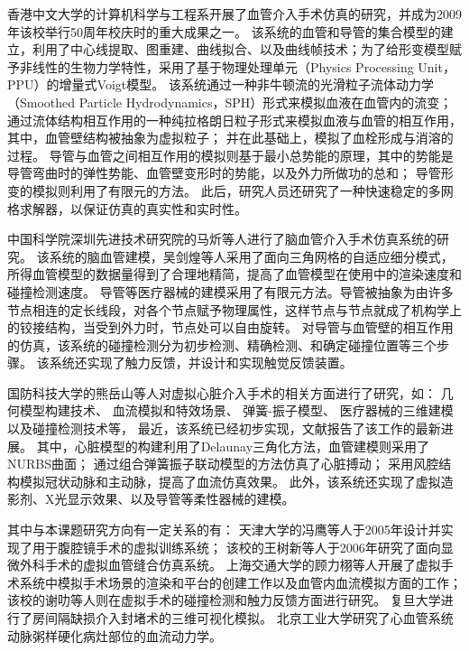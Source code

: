 香港中文大学的计算机科学与工程系开展了血管介入手术仿真的研究\cite{guo2007CUHK}\cite{Chui2010CUHK}\cite{Li2011CUHK}\cite{Li2012CUHK}，并成为2009年该校举行50周年校庆时的重大成果之一\cite{cuhkweb}。
该系统的血管和导管的集合模型的建立，利用了中心线提取、图重建、曲线拟合、以及曲线帧技术；为了给形变模型赋予非线性的生物力学特性，采用了基于物理处理单元（Physics Processing Unit，PPU）的增量式Voigt模型\cite{guo2007CUHK}。
该系统通过一种非牛顿流的光滑粒子流体动力学（Smoothed Particle Hydrodynamics，SPH）形式来模拟血液在血管内的流变；
通过流体结构相互作用的一种纯拉格朗日粒子形式来模拟血液与血管的相互作用，其中，血管壁结构被抽象为虚拟粒子；
并在此基础上，模拟了血栓形成与消溶的过程\cite{Chui2010CUHK}。
导管与血管之间相互作用的模拟则基于最小总势能的原理，其中的势能是导管弯曲时的弹性势能、血管壁变形时的势能，以及外力所做功的总和；
导管形变的模拟则利用了有限元的方法\cite{Li2011CUHK}。
此后，研究人员还研究了一种快速稳定的多网格求解器，以保证仿真的真实性和实时性\cite{Li2012CUHK}。

中国科学院深圳先进技术研究院的马炘等人\cite{Ma2010SIAT}\cite{Ma2010aSIAT}进行了脑血管介入手术仿真系统的研究。
该系统的脑血管建模，吴剑煌等人采用了面向三角网格的自适应细分模式\cite{Ma2010bSIAT}\cite{Wu2006SIAT}，所得血管模型的数据量得到了合理地精简，提高了血管模型在使用中的渲染速度和碰撞检测速度。
导管等医疗器械的建模采用了有限元方法。导管被抽象为由许多节点相连的定长线段，对各个节点赋予物理属性，这样节点与节点就成了机构学上的铰接结构，当受到外力时，节点处可以自由旋转\cite{Ma2010SIAT}。
对导管与血管壁的相互作用的仿真，该系统的碰撞检测分为初步检测、精确检测、和确定碰撞位置等三个步骤\cite{Ma2010SIAT}。
该系统还实现了触力反馈，并设计和实现触觉反馈装置\cite{Ma2010SIAT}。

国防科技大学的熊岳山等人对虚拟心脏介入手术的相关方面进行了研究，如：
几何模型构建技术\cite{han2005master}、
血流模拟和特效场景\cite{ren2005master}\cite{Ren2006NUDT}、
弹簧-振子模型\cite{wang2006master}\cite{Wang2008NUDT}、
医疗器械的三维建模\cite{zhu2007master}
以及碰撞检测技术\cite{kang2007master}等，
最近，该系统已经初步实现，文献\cite{Tan2012NUDT}报告了该工作的最新进展。
其中，心脏模型的构建利用了Delaunay三角化方法，血管建模则采用了NURBS曲面；
通过组合弹簧振子联动模型的方法仿真了心脏搏动\cite{Wang2008NUDT}；
采用风腔结构\cite{Ren2006NUDT}模拟冠状动脉和主动脉，提高了血流仿真效果。
此外，该系统还实现了虚拟造影剂、X光显示效果、以及导管等柔性器械的建模\cite{Tan2012NUDT}。

其中与本课题研究方向有一定关系的有：
天津大学的冯鹰\cite{li2005master}等人于2005年设计并实现了用于腹腔镜手术的虚拟训练系统；
该校的王树新等人\cite{zeng2006master}于2006年研究了面向显微外科手术的虚拟血管缝合仿真系统。
上海交通大学的顾力栩等人开展了虚拟手术系统中模拟手术场景的渲染和平台的创建工作\cite{zheng2008master}以及血管内血流模拟方面的工作\cite{huang2011virtual}；
该校的谢叻等人则在虚拟手术的碰撞检测\cite{wu2010virtual}和触力反馈\cite{wu2011virtual}方面进行研究。
复旦大学进行了房间隔缺损介入封堵术的三维可视化模拟\cite{Zhao2006Fudan}。
北京工业大学研究了心血管系统动脉粥样硬化病灶部位的血流动力学\cite{Huang2003BJUT}。

